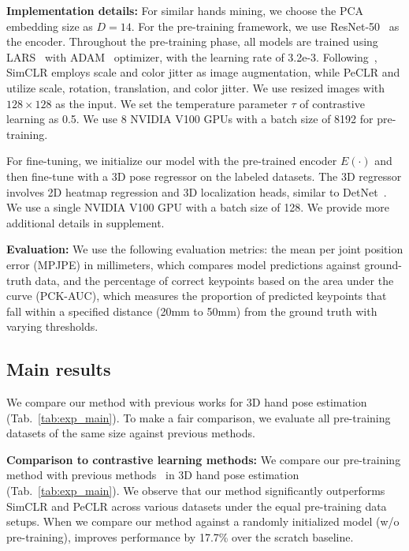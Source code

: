 \textbf{Implementation details:}
For similar hands mining, we choose the PCA embedding size as $D=14$. For the pre-training framework, we use ResNet-50~\citep{he:cvpr16} as the encoder. Throughout the pre-training phase, all models are trained using LARS~\citep{you:arxiv17} with ADAM~\citep{kingma:arxiv14} optimizer, with the learning rate of 3.2e-3. Following~\citep{spurr:iccv21}, SimCLR employs scale and color jitter as image augmentation, while PeCLR and \Ours utilize scale, rotation, translation, and color jitter. We use resized images with \(128 \times 128\) as the input. We set the temperature parameter $\tau$ of contrastive learning as 0.5. We use 8 NVIDIA V100 GPUs with a batch size of 8192 for pre-training.

For fine-tuning, we initialize our model with the pre-trained encoder $E(\cdot)$ and then fine-tune with a 3D pose regressor on the labeled datasets. The 3D regressor involves 2D heatmap regression and 3D localization heads, similar to DetNet~\citep{zhou:cvpr20}. 
We use a single NVIDIA V100 GPU with a batch size of 128. We provide more additional details in supplement.

\textbf{Evaluation:}
We use the following evaluation metrics: the mean per joint position error (MPJPE) in millimeters, which compares model predictions against ground-truth data, and the percentage of correct keypoints based on the area under the curve (PCK-AUC), which measures the proportion of predicted keypoints that fall within a specified distance (20mm to 50mm) from the ground truth with varying thresholds.




\subsection{Main results}\label{sec:exp_main}

We compare our method with previous works for 3D hand pose estimation (Tab.~\ref{tab:exp_main}). To make a fair comparison, we evaluate all pre-training datasets of the same size against previous methods.

\textbf{Comparison to contrastive learning methods:}
We compare our pre-training method with previous methods~\citep{chen:icml20, spurr:iccv21} in 3D hand pose estimation (Tab.~\ref{tab:exp_main}). We observe that our method significantly outperforms SimCLR and PeCLR across various datasets under the equal pre-training data setups. When we compare our method against a randomly initialized model (w/o pre-training), \Ours improves performance by 17.7\% over the scratch baseline.

